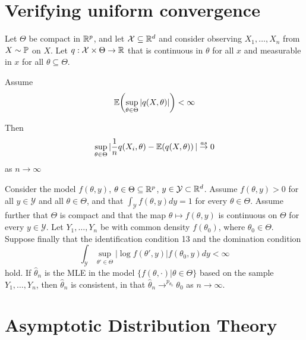 \section{Verifying uniform convergence}
\label{sec:verify-unif-conv}

\begin{thm}
  Let $\Theta$ be compact in $\mathbb{R}^{p}$, and let $\mathcal{X} \subseteq \mathbb{R}^{d}$
  and consider observing $X_{1}, \dots, X_{n}$ \iid from $X \sim
  \Prob$ on $X$.  Let $q: \mathcal{X} \times \Theta \rightarrow \mathbb{R}$
  that is continuous in $\theta$ for all $x$ and measurable in $x$ for
  all $\theta \subseteq \Theta$.

  Assume
  \begin{equation}
    \label{eq:50}
    \E{\sup_{\theta \in \Theta} | q(X, \theta)|} < \infty
  \end{equation}

  Then
  \begin{equation}
    \label{eq:51}
    \sup_{\theta \in \Theta} | \frac{1}{n} q(X_{i}, \theta) - \E{q(X,
      \theta)} | \cas 0
  \end{equation} as $n \rightarrow \infty$
\end{thm}

\begin{thm}
  Consider the model $f(\theta, y)$, $\theta \in \Theta \subseteq
  \mathbb{R}^{p}$, $y \in \mathcal{Y} \subset \mathbb{R}^{d}$.  Assume $f(\theta, y) >
  0$ for all $y \in \mathcal{Y}$ and all $\theta \in \Theta$, and that
  $\int_{\mathcal{Y}} f(\theta, y) dy = 1$ for every $\theta \in
  \Theta$. Assume further that $\Theta$ is compact and that the map
  $\theta \mapsto f(\theta, y)$ is continuous on $\Theta$ for every $y
  \in \mathcal{Y}$.  Let $Y_{1}, \dots, Y_{n}$ be \iid with common
  density $f(\theta_{0})$, where $\theta_{0} \in \Theta$.  Suppose
  finally that the identification condition 13 and the domination
  condition
  \begin{equation}
    \label{eq:2}
    \int_{\mathcal{Y}} \sup_{\theta' \in \Theta} | \log f(\theta', y)
    | f(\theta_{0}, y) dy < \infty
  \end{equation} hold.  If $\hat \theta_{n}$ is the MLE in the model
  $\{ f(\theta, \cdot) | \theta \in \Theta \} $ based on the sample
  $Y_{1}, \dots, Y_{n}$, then $\hat \theta_{n}$ is consistent, in that
  $\hat \theta_{n} \rightarrow^{p_{\theta_{0}}} \theta_{0}$ as $n
  \rightarrow \infty$.
\end{thm}

\section{Asymptotic Distribution Theory}
\label{sec:asympt-distr-theory}






